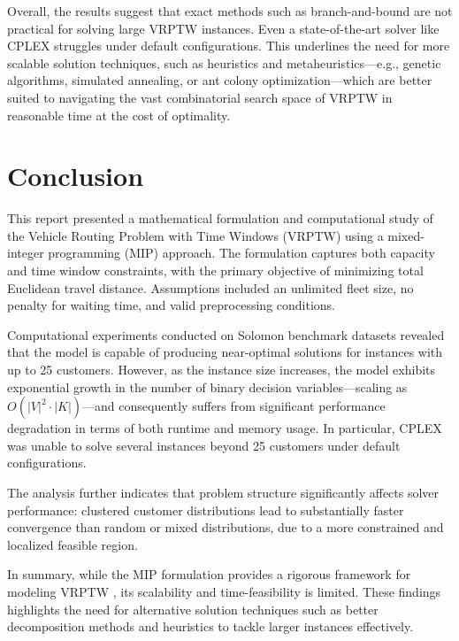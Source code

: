 \documentclass[twocolumn, 10pt]{article}
\begin{document}
Overall, the results suggest that exact methods such as branch-and-bound
 are not practical for solving large VRPTW instances.
  Even a state-of-the-art solver like CPLEX struggles under default configurations. 
  This underlines the need for more scalable solution techniques, 
  such as heuristics and metaheuristics—e.g., genetic algorithms, simulated annealing, 
  or ant colony optimization—which are better suited to navigating the vast combinatorial search space of VRPTW in reasonable time at the 
  cost of optimality.


\section*{Conclusion}

This report presented a mathematical formulation and computational study
 of the Vehicle Routing Problem with Time Windows (VRPTW) 
 using a mixed-integer programming (MIP) approach.
  The formulation captures both capacity and time window constraints, 
  with the primary objective of minimizing total Euclidean travel distance. 
  Assumptions included an unlimited fleet size, no penalty for waiting time, and valid preprocessing conditions.

Computational experiments 
conducted on Solomon benchmark datasets revealed that the model is capable of 
producing near-optimal solutions for instances with up to 25 customers.
 However, as the instance size increases,
  the model exhibits exponential growth in the number of binary decision variables—scaling as \(O(|V|^2 \cdot |K|)\)—and 
  consequently suffers from significant performance degradation in terms of both runtime and memory usage.
   In particular, CPLEX was unable to solve several instances beyond 25 customers under default configurations.

The analysis further indicates that problem structure significantly 
affects solver performance:
 clustered customer distributions lead to
  substantially faster convergence than random or mixed distributions, 
  due to a more constrained and localized feasible region.

In summary, while the MIP formulation provides a
 rigorous framework for modeling VRPTW
 , its scalability and time-feasibility is limited. These findings highlights the need for alternative 
 solution techniques such as better decomposition methods and heuristics to tackle larger instances effectively.





% 
\end{document}
